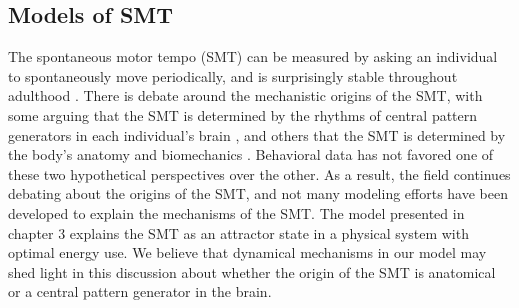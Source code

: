 \documentclass{report}
\begin{document}
\subsection{Models of SMT}
The spontaneous motor tempo (SMT) can be measured by asking an individual to spontaneously move periodically, and is surprisingly stable throughout adulthood \cite{scheurich2018tapping}. There is debate around the mechanistic origins of the SMT, with some arguing that the SMT is determined by the rhythms of central pattern generators in each individual's brain \cite{latash1992virtual}, and others that the SMT is determined by the body's anatomy and biomechanics \cite{goodman2000advantages}. Behavioral data has not favored one of these two hypothetical perspectives over the other. As a result, the field continues debating about the origins of the SMT, and not many modeling efforts have been developed to explain the mechanisms of the SMT. The model presented in chapter 3 explains the SMT as an attractor state in a physical system with optimal energy use. We believe that dynamical mechanisms in our model may shed light in this discussion about whether the origin of the SMT is anatomical or a central pattern generator in the brain. 
\end{document}
